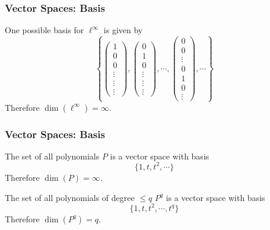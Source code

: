 \documentclass{beamer}
\begin{document}
\begin{frame}\frametitle{Vector Spaces: Basis}

\begin{example}
One possible basis for $\boldsymbol{\ell}^\infty$ is given by
\[
\left\{
  \left(
    \begin{array}{c}
      1\\
      0\\
      0\\
      \vdots\\
      \vdots\\
      \vdots
    \end{array}
  \right)
  ,\left(
    \begin{array}{c}
      0\\
      1\\
      0\\
      \vdots\\
      \vdots\\
      \vdots
    \end{array}
  \right)
  ,\cdots,
  \left(
    \begin{array}{c}
      0\\
      0\\
      \vdots\\
      0\\
      1\\
      0\\
      \vdots
    \end{array}
  \right)
  ,\cdots
\right\}
\]
Therefore $\dim(\boldsymbol{\ell}^\infty) = \infty$.
\end{example}
\end{frame}

\begin{frame}\frametitle{Vector Spaces: Basis}
\begin{example}
The set of all polynomials $P$ is a vector space with basis
\[ \{1,t,t^2,\cdots\} \]
Therefore $\dim(P) = \infty$.
\end{example}

\begin{example}
The set of all polynomials of degree $\leq q$ $P^q$ is a vector space with basis
\[ \{1,t,t^2,\cdots, t^q\} \]
Therefore $\dim(P^q) = q$.
\end{example}
\end{frame}
\end{document}
